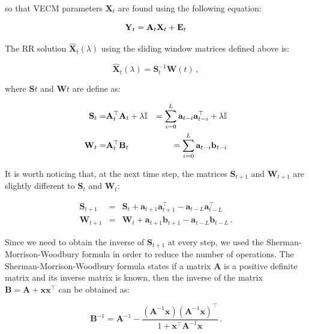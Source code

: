 \documentclass[twocolumn]{svjour3}          %
\begin{document}
\noindent so that VECM parameters $\mathbf{X}_t$ are found using the following
equation:

\begin{equation}
\mathbf{Y}_t = \mathbf{A}_t \mathbf{X}_t + \mathbf{E}_t\\
\end{equation}

The RR solution $\mathbf{\hat{X}}_t(\lambda)$ using the sliding window matrices defined above
is:

\begin{equation}
\label{eq:oproblem}
\mathbf{\hat{X}}_t(\lambda)=\mathbf{S}_t^{-1} \mathbf{W}(t) \, ,
\end{equation}

\noindent where $\mathbf{S}{t}$ and $\mathbf{W}{t}$ are define as:

\begin{eqnarray*}
\mathbf{S}_t =&{\bf A}_t^\top{\bf A}_t+ \lambda \mathbb{I} &=
\sum_{i=0}^L \mathbf{a}_{t-i}\mathbf{a}_{t-i}^\top + \lambda \mathbb{I}
\label{eq:S} \\
\mathbf{W}_t =& {\bf A}_t^\top{\bf B}_t &= 
\sum_{i=0}^L \mathbf{a}_{t-i}\mathbf{b}_{t-i} 
\label{eq:W}
\end{eqnarray*}

It is worth noticing that, at the next time step, the matrices $\mathbf{S}_{t+1}$
and $\mathbf{W}_{t+1}$ are slightly different to $\mathbf{S}_t$ and
$\mathbf{W}_t$:

\begin{eqnarray*}
\mathbf{S}_{t+1}&=&
\mathbf{S}_t +
\mathbf{a}_{t+1}
\mathbf{a}_{t+1}^\top -
\mathbf{a}_{t-L} \mathbf{a}_{t-L}^\top \\
\mathbf{W}_{t+1}&=&
\mathbf{W}_t +
\mathbf{a}_{t+1}
\mathbf{b}_{t+1} -
\mathbf{a}_{t-L} \mathbf{b}_{t-L} \, .
\end{eqnarray*}

Since we need to obtain the inverse of $\mathbf{S}_{t+1}$ at every step,
we used the Sherman-Morrison-Woodbury formula in order to reduce the number of operations. 
The Sherman-Morrison-Woodbury formula states if a matrix $\mathbf{A}$ is a positive
definite matrix and its inverse matrix is known, then the inverse of the
matrix $\mathbf{B}=\mathbf{A} + \mathbf{x}\mathbf{x}^\top$ can be
obtained as: 

\begin{equation}
\label{eq:SMW}
\mathbf{B}^{-1} = \mathbf{A}^{-1} -
\frac{(\mathbf{A}^{-1}\mathbf{x})(\mathbf{A}^{-1}\mathbf{x})^{\top}}
{1 + \mathbf{x}^{\top} \mathbf{A}^{-1} \mathbf{x}} \, .
\end{equation}
\end{document}

